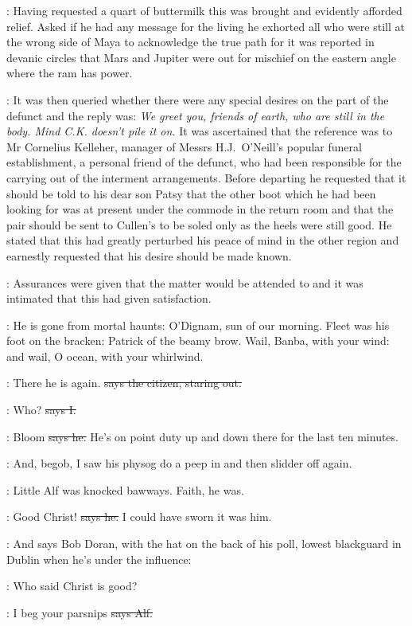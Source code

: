 :
Having requested a quart of buttermilk this was
brought and evidently afforded relief.
Asked if he had any message
for the living he exhorted all who were still at the wrong side of Maya
to acknowledge the true path for it was reported in devanic circles that
Mars and Jupiter were out for mischief on the eastern angle where the
ram has power.%

:
It was then queried whether there were any special
desires on the part of the defunct and the reply was:
\emph{We greet you,
friends of earth,
who are still in the body.
Mind C.K. doesn't pile it on.}
It was ascertained that the reference was to Mr Cornelius Kelleher,
manager of Messrs H.J.~O'Neill's popular funeral establishment,
a personal friend of the defunct,
who had been responsible for the carrying
out of the interment arrangements.
Before departing he requested that it
should be told to his dear son Patsy that the other boot which he had been
looking for was at present under the commode in the return room and that
the pair should be sent to Cullen's to be soled only as the heels were
still good.%
He stated that this had greatly perturbed his peace of mind in
the other region and earnestly requested that his desire should be made
known.

:
Assurances were given that the matter would be attended to and it was
intimated that this had given satisfaction.

:
He is gone from mortal haunts:
O'Dignam,
sun of our morning.
Fleet
was his foot on the bracken:
Patrick of the beamy brow.
Wail,
Banba,
with
your wind:
and wail,
O ocean,
with your whirlwind.

\citizen:
There he is again.
\sout{says the citizen,
staring out.}

:
Who?
\sout{says I.}

\citizen:
Bloom
\sout{says he.}
He's on point duty up and down there for the last ten
minutes.%

\Nq:
And,
begob,
I saw his physog do a peep in
and then slidder off again.

\Nq:
Little Alf was knocked bawways.
Faith,
he was.

\bergan:
Good Christ!
\sout{says he.}
I could have sworn it was him.

\Nq:
And says Bob Doran,
with the hat on the back of his poll,
lowest
blackguard in Dublin when he's under the influence:

\doran:
Who said Christ is good?

\bergan:
I beg your parsnips
\sout{says Alf.}

